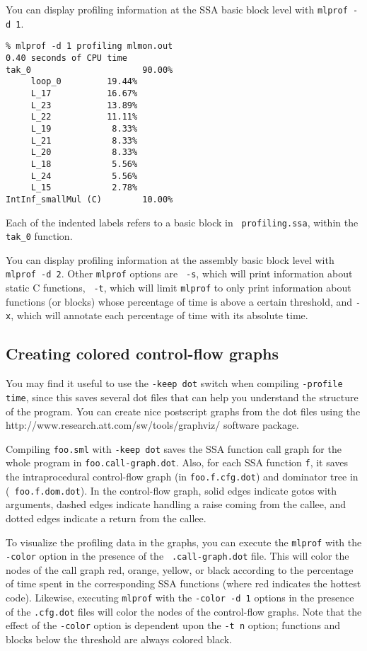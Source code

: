 You can display profiling information at the SSA basic block level
with {\tt mlprof -d 1}.

\begin{verbatim}
% mlprof -d 1 profiling mlmon.out
0.40 seconds of CPU time
tak_0                      90.00%
     loop_0         19.44%       
     L_17           16.67%       
     L_23           13.89%       
     L_22           11.11%       
     L_19            8.33%       
     L_21            8.33%       
     L_20            8.33%       
     L_18            5.56%       
     L_24            5.56%       
     L_15            2.78%       
IntInf_smallMul (C)        10.00%
\end{verbatim}
Each of the indented labels refers to a basic block in {\tt
  profiling.ssa}, within the {\tt tak\_0} function.

You can display profiling information at the assembly basic block
level with {\tt mlprof -d 2}.  Other {\tt mlprof} options are {\tt
  -s}, which will print information about static C functions, {\tt
  -t}, which will limit {\tt mlprof} to only print information about
functions (or blocks) whose percentage of time is above a certain
threshold, and {\tt -x}, which will annotate each percentage of time
with its absolute time.

\subsection{Creating colored control-flow graphs}

You may find it useful to use the {\tt -keep dot} switch when
compiling {\tt -profile time}, since this saves several dot files that
can help you understand the structure of the program.  You can create
nice postscript graphs from the dot files using the
		  {http://www.research.att.com/sw/tools/graphviz/}
software package.

Compiling {\tt foo.sml} with {\tt -keep dot} saves the SSA function
call graph for the whole program in {\tt foo.call-graph.dot}.  Also,
for each SSA function {\tt f}, it saves the intraprocedural
control-flow graph (in {\tt foo.f.cfg.dot}) and dominator tree in ({\tt
foo.f.dom.dot}).  In the control-flow graph, solid edges indicate
gotos with arguments, dashed edges indicate handling a raise coming
from the callee, and dotted edges indicate a return from the callee.

To visualize the profiling data in the graphs, you can execute the
{\tt mlprof} with the {\tt -color} option in the presence of the {\tt
.call-graph.dot} file.  This will color the nodes of the call graph
red, orange, yellow, or black according to the percentage of time
spent in the corresponding SSA functions (where red indicates the
hottest code).  Likewise, executing {\tt mlprof} with the {\tt -color
-d 1} options in the presence of the {\tt .cfg.dot} files will color
the nodes of the control-flow graphs.  Note that the effect of the
{\tt -color} option is dependent upon the {\tt -t n} option; functions
and blocks below the threshold are always colored black.

